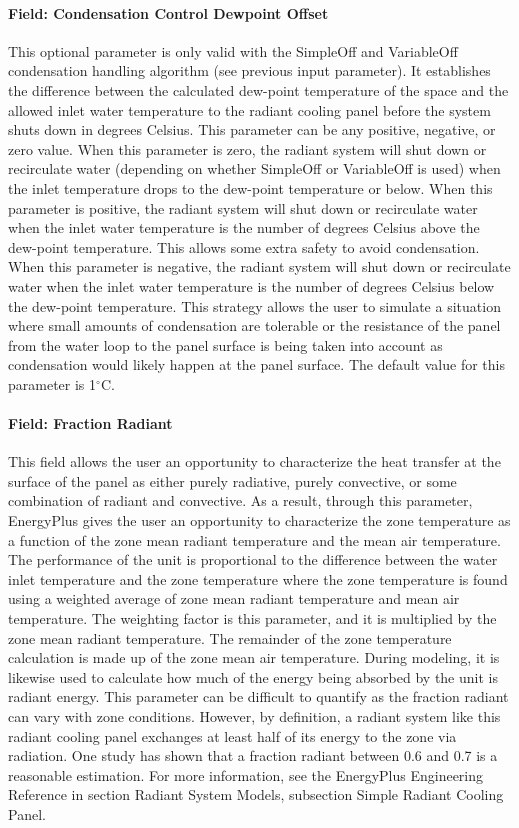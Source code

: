 \paragraph{Field: Condensation Control Dewpoint Offset}

This optional parameter is only valid with the SimpleOff and VariableOff condensation handling algorithm (see previous input parameter). It establishes the difference between the calculated dew-point temperature of the space and the allowed inlet water temperature to the radiant cooling panel before the system shuts down in degrees Celsius. This parameter can be any positive, negative, or zero value. When this parameter is zero, the radiant system will shut down or recirculate water (depending on whether SimpleOff or VariableOff is used) when the inlet temperature drops to the dew-point temperature or below. When this parameter is positive, the radiant system will shut down or recirculate water when the inlet water temperature is the number of degrees Celsius above the dew-point temperature. This allows some extra safety to avoid condensation. When this parameter is negative, the radiant system will shut down or recirculate water when the inlet water temperature is the number of degrees Celsius below the dew-point temperature. This strategy allows the user to simulate a situation where small amounts of condensation are tolerable or the resistance of the panel from the water loop to the panel surface is being taken into account as condensation would likely happen at the panel surface. The default value for this parameter is 1$^\circ$C.

\paragraph{Field: Fraction Radiant}\label{field-fraction-radiant-2-000-1}

This field allows the user an opportunity to characterize the heat transfer at the surface of the panel as either purely radiative, purely convective, or some combination of radiant and convective.  As a result, through this parameter, EnergyPlus gives the user an opportunity to characterize the zone temperature as a function of the zone mean radiant temperature and the mean air temperature.  The performance of the unit is proportional to the difference between the water inlet temperature and the zone temperature where the zone temperature is found using a weighted average of zone mean radiant temperature and mean air temperature.  The weighting factor is this parameter, and it is multiplied by the zone mean radiant temperature.  The remainder of the zone temperature calculation is made up of the zone mean air temperature.  During modeling, it is likewise used to calculate how much of the energy being absorbed by the unit is radiant energy.  This parameter can be difficult to quantify as the fraction radiant can vary with zone conditions.  However, by definition, a radiant system like this radiant cooling panel exchanges at least half of its energy to the zone via radiation.  One study has shown that a fraction radiant between 0.6 and 0.7 is a reasonable estimation.  For more information, see the EnergyPlus Engineering Reference in section Radiant System Models, subsection Simple Radiant Cooling Panel.

